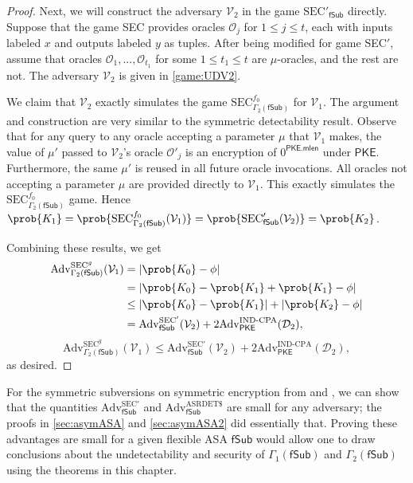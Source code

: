 \begin{proof}
Next, we will construct the adversary $\mathcal{V}_2$ in the game $\mathrm{SEC'}_{\mathsf{fSub}}$ directly. Suppose that the game SEC provides oracles $\mathcal{O}_j$ for $1\le j\le t$, each with inputs labeled $x$ and outputs labeled $y$ as tuples. After being modified for game SEC$'$, assume that oracles $\mathcal{O}_1, ... ,\mathcal{O}_{t_1}$ for some $1 \le t_1 \le t$ are $\mu$-oracles, and the rest are not. The adversary $\mathcal{V}_2$ is given in \autoref{game:UDV2}.

We claim that $\mathcal{V}_2$ exactly simulates the game $\mathrm{SEC}^{f_0}_{\Gamma_2(\mathsf{fSub})}$ for $\mathcal{V}_1$. The argument and construction are very similar to the symmetric detectability result. Observe that for any query to any oracle accepting a parameter $\mu$ that $\mathcal{V}_1$ makes, the value of $\mu'$ passed to $\mathcal{V}_2$'s oracle $\mathcal{O}'_j$ is an encryption of $0^\mathsf{PKE.mlen}$ under $\mathsf{PKE}$. Furthermore, the same $\mu'$ is reused in all future oracle invocations. All oracles not accepting a parameter $\mu$ are provided directly to $\mathcal{V}_1$. This exactly simulates the $\mathrm{SEC}^{f_0}_{\Gamma_2(\mathsf{fSub})}$ game. Hence $\prob{K_1}=\prob{\mathrm{SEC}^{f_0}_{\Gamma_2(\mathsf{fSub})}(\mathcal{V}_1)}=\prob{\mathrm{SEC}'_{\mathsf{fSub}}(\mathcal{V}_2)}=\prob{K_2}$.

Combining these results, we get
\iffullversion
\begin{align*}
\mathrm{Adv}^{\mathrm{SEC}^g}_{\Gamma_2(\mathsf{fSub})}(\mathcal{V}_1)
&= |\prob{K_0}-\phi| \\
&= |\prob{K_0}-\prob{K_1}+\prob{K_1}-\phi| \\
&\le |\prob{K_0}-\prob{K_1}|+|\prob{K_2}-\phi| \\
&= \mathrm{Adv}^{\mathrm{SEC'}}_{\mathsf{fSub}}(\mathcal{V}_2) + 2\mathrm{Adv}^{\mathrm{IND}\text{-}\mathrm{CPA}}_\mathsf{PKE}(\mathcal{D}_2),
\end{align*}
\else
\[
\mathrm{Adv}^{\mathrm{SEC}^g}_{\Gamma_2(\mathsf{fSub})}(\mathcal{V}_1) \le \mathrm{Adv}^{\mathrm{SEC'}}_{\mathsf{fSub}}(\mathcal{V}_2) + 2\mathrm{Adv}^{\mathrm{IND}\text{-}\mathrm{CPA}}_\mathsf{PKE}(\mathcal{D}_2),
\]
\fi
as desired.
\end{proof}

For the symmetric subversions on symmetric encryption from \cite{C:BelPatRog14} and \cite{CCS:BelJaeKan15}, we can show that the quantities $\mathrm{Adv}^{\mathrm{SEC'}}_{\mathsf{fSub}}$ and $\mathrm{Adv}^{\mathrm{ASRDET}\$}_{\mathsf{fSub}}$ are small for any adversary; the proofs in \autoref{sec:asymASA} and \autoref{sec:asymASA2} did essentially that. Proving these advantages are small for a given flexible ASA $\mathsf{fSub}$ would allow one to draw conclusions about the undetectability and security of $\Gamma_1(\mathsf{fSub})$ and $\Gamma_2(\mathsf{fSub})$ using the theorems in this chapter.